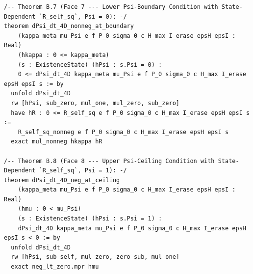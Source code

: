 \documentclass[11pt,a4paper]{article}
\theoremstyle{definition}
\begin{document}
\begin{lstlisting}[language=Lean4]
/-- Theorem B.7 (Face 7 --- Lower Psi-Boundary Condition with State-Dependent `R_self_sq`, Psi = 0): -/
theorem dPsi_dt_4D_nonneg_at_boundary
    (kappa_meta mu_Psi e f P_0 sigma_0 c H_max I_erase epsH epsI : Real)
    (hkappa : 0 <= kappa_meta)
    (s : ExistenceState) (hPsi : s.Psi = 0) :
    0 <= dPsi_dt_4D kappa_meta mu_Psi e f P_0 sigma_0 c H_max I_erase epsH epsI s := by
  unfold dPsi_dt_4D
  rw [hPsi, sub_zero, mul_one, mul_zero, sub_zero]
  have hR : 0 <= R_self_sq e f P_0 sigma_0 c H_max I_erase epsH epsI s :=
    R_self_sq_nonneg e f P_0 sigma_0 c H_max I_erase epsH epsI s
  exact mul_nonneg hkappa hR

/-- Theorem B.8 (Face 8 --- Upper Psi-Ceiling Condition with State-Dependent `R_self_sq`, Psi = 1): -/
theorem dPsi_dt_4D_neg_at_ceiling
    (kappa_meta mu_Psi e f P_0 sigma_0 c H_max I_erase epsH epsI : Real)
    (hmu : 0 < mu_Psi)
    (s : ExistenceState) (hPsi : s.Psi = 1) :
    dPsi_dt_4D kappa_meta mu_Psi e f P_0 sigma_0 c H_max I_erase epsH epsI s < 0 := by
  unfold dPsi_dt_4D
  rw [hPsi, sub_self, mul_zero, zero_sub, mul_one]
  exact neg_lt_zero.mpr hmu


\end{lstlisting}
\end{document}
